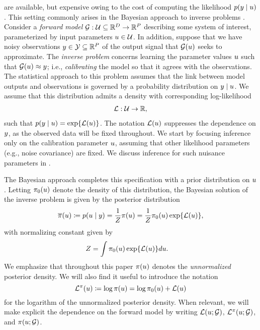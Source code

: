 \documentclass[12pt]{article}
\begin{document}
are available, but expensive owing to the cost of computing the likelihood $p(y \mid u)$. This setting 
commonly arises in the Bayesian approach to inverse problems \citep{Stuart_BIP}. 
Consider a \textit{forward model} $\mathcal{G}: \mathcal{U} \subseteq \mathbb{R}^{D} \to \mathbb{R}^{P}$ describing 
some system of interest, parameterized by input parameters $u \in \mathcal{U}$. In addition, suppose that 
we have noisy observations $y \in \mathcal{Y} \subseteq \mathbb{R}^{P}$ of the output signal that $\mathcal{G}(u)$ 
seeks to approximate. The \textit{inverse problem} concerns learning the parameter values $u$ such
 that $\mathcal{G}(u) \approx y$; i.e., \textit{calibrating} the model so that it agrees with the observations. 
 The statistical approach to this problem assumes that the link between model outputs and 
observations is governed by a probability distribution on $y \mid u$. We assume that this distribution 
admits a density with corresponding log-likelihood 
\begin{align}
\mathcal{L}: \mathcal{U} \to \mathbb{R}, \label{log_likelihood}
\end{align}
such that $p(y \mid u) = \exp\mathopen{}\left\{\mathcal{L}(u)\right\}\mathclose{}$. The notation $\mathcal{L}(u)$ suppresses the dependence 
on $y$, as the observed data will be fixed throughout. We start by focusing inference only on the 
calibration parameter $u$, assuming that other likelihood parameters (e.g., noise covariance) 
are fixed. We discuss inference for such nuisance parameters in .

The Bayesian approach completes this specification with a prior distribution 
on $u$. Letting $\pi_0(u)$ denote the density of this distribution, the Bayesian solution of the inverse problem is given 
by the posterior distribution
\begin{align}
\overline{\pi}(u) \coloneqq p(u \mid y) = \frac{1}{Z}\pi(u) = \frac{1}{Z} \pi_0(u) \exp\mathopen{}\left\{\mathcal{L}(u)\right\}\mathclose{}, \label{post_dens}
\end{align}
with normalizing constant given by 
\begin{align}
Z &= \int \pi_0(u) \exp\mathopen{}\left\{\mathcal{L}(u)\right\}\mathclose{} du. \label{norm_cst}
\end{align}
We emphasize that throughout this paper $\pi(u)$ denotes the \textit{unnormalized} 
posterior density. We will also find it useful to introduce the notation
\begin{equation}
\mathcal{L}^{\pi}(u) \coloneqq \log \pi(u) = \log \pi_0(u) + \mathcal{L}(u) \label{eq:lpost}
\end{equation}
for the logarithm of the unnormalized posterior density.
When relevant, we will make explicit the dependence on the forward 
model by writing $\mathcal{L}(u; \mathcal{G})$, $\mathcal{L}^{\pi}(u; \mathcal{G})$, and $\pi(u; \mathcal{G})$. 
\end{document}
